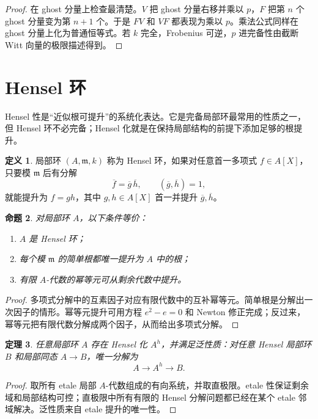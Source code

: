 \documentclass[11pt,a4paper,openany]{ctexbook}
\numberwithin{equation}{chapter}
\theoremstyle{plain}
\newtheorem{theorem}{定理}[chapter]
\newtheorem{proposition}[theorem]{命题}
\theoremstyle{definition}
\newtheorem{definition}[theorem]{定义}
\theoremstyle{remark}
\begin{document}
\begin{proof}
在 ghost 分量上检查最清楚。$V$ 把 ghost 分量右移并乘以 $p$，$F$ 把第 $n$ 个 ghost 分量变为第 $n+1$ 个。于是 $FV$ 和 $VF$ 都表现为乘以 $p$。乘法公式同样在 ghost 分量上化为普通恒等式。若 $k$ 完全，Frobenius 可逆，$p$ 进完备性由截断 Witt 向量的极限描述得到。
\end{proof}

\section{Hensel 环}

Hensel 性是“近似根可提升”的系统化表达。它是完备局部环最常用的性质之一，但 Hensel 环不必完备；Hensel 化就是在保持局部结构的前提下添加足够的根提升。

\begin{definition}
局部环 $(A,\mathfrak m,k)$ 称为 Hensel 环，如果对任意首一多项式 $f\in A[X]$，只要模 $\mathfrak m$ 后有分解
\[
  \overline f=\overline g\,\overline h,\qquad (\overline g,\overline h)=1,
\]
就能提升为 $f=gh$，其中 $g,h\in A[X]$ 首一并提升 $\overline g,\overline h$。
\end{definition}

\begin{proposition}
对局部环 $A$，以下条件等价：
\begin{enumerate}[label=(\arabic*)]
\item $A$ 是 Hensel 环；
\item 每个模 $\mathfrak m$ 的简单根都唯一提升为 $A$ 中的根；
\item 有限 $A$-代数的幂等元可从剩余代数中提升。
\end{enumerate}
\end{proposition}

\begin{proof}
多项式分解中的互素因子对应有限代数中的互补幂等元。简单根是分解出一次因子的情形。幂等元提升可用方程 $e^2-e=0$ 和 Newton 修正完成；反过来，幂等元把有限代数分解成两个因子，从而给出多项式分解。
\end{proof}

\begin{theorem}
任意局部环 $A$ 存在 Hensel 化 $A^h$，并满足泛性质：对任意 Hensel 局部环 $B$ 和局部同态 $A\to B$，唯一分解为
\[
  A\longrightarrow A^h\longrightarrow B.
\]
\end{theorem}

\begin{proof}
取所有 etale 局部 $A$-代数组成的有向系统，并取直极限。etale 性保证剩余域和局部结构可控；直极限中所有有限的 Hensel 分解问题都已经在某个 etale 邻域解决。泛性质来自 etale 提升的唯一性。
\end{proof}
\end{document}
